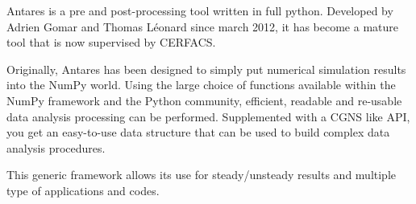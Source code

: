 
\label{app:antares}

Antares is a pre and post-processing tool written in full python.
Developed by Adrien Gomar and Thomas Léonard since march 2012, 
it has become a mature tool that is now supervised by
CERFACS.

Originally, Antares has been designed to simply put
numerical simulation results into the NumPy world. 
Using the large choice of functions 
available within the NumPy framework and the Python community,
efficient, readable and re-usable data analysis processing can be performed.
Supplemented with a CGNS like API, you get an easy-to-use data structure
that can be used to build complex data analysis procedures.

This generic framework allows its use for steady/unsteady results and
multiple type of applications and codes.





